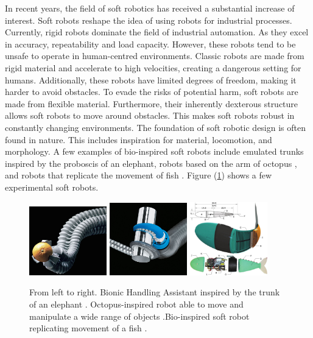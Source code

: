 In recent years, the field of soft robotics has received a substantial increase of interest. Soft robots reshape the idea of using robots for industrial processes. Currently, rigid robots dominate the field of industrial automation. As they excel in accuracy, repeatability and load capacity. However, these robots tend to be unsafe to operate in human-centred environments. Classic robots are made from rigid material and accelerate to high velocities, creating a dangerous setting for humans. Additionally, these robots have limited degrees of freedom, making it harder to avoid obstacles. To evade the risks of potential harm, soft robots are made from flexible material. Furthermore, their inherently dexterous structure allows soft robots to move around obstacles. This makes soft robots robust in constantly changing environments. The foundation of soft robotic design is often found in nature. This includes inspiration for material, locomotion, and morphology. A few examples of bio-inspired soft robots include emulated trunks \cite{hannan2003kinematics} inspired by the proboscis of an elephant, robots based on the arm of octopus \cite{wang2013visual}, and robots that replicate the movement of fish \cite{marchese2014}. Figure (\ref{fig1:softexample}) shows a few experimental soft robots. 


\begin{figure}[H]       
    \includegraphics[width = 0.3\textwidth]{Figures/Introduction/bhasinasappel.jpg}   
    \hspace{0px}
    \includegraphics[width = 0.3\textwidth]{Figures/Introduction/tentaclegripper.jpg}
    \hspace{0px}
    \includegraphics[width = 0.3\textwidth]{Figures/Introduction/fish.jpg}
    \caption{From left to right. Bionic Handling Assistant inspired by the trunk of an elephant \cite{BHA}. Octopus-inspired robot able to move and manipulate a wide range of objects \cite{octopus}.Bio-inspired soft robot replicating movement of a fish \cite{marchese2014}.}
    \label{fig1:softexample}
\end{figure}

